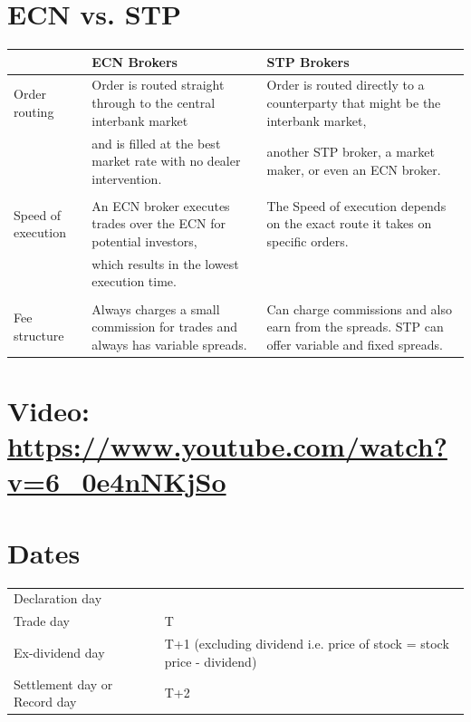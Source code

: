 \documentclass[11pt]{article}
\begin{document}
\section{ECN vs. STP}
\label{sec:org0b5b69e}
\begin{center}
\begin{tabular}{lll}
\hline
 & ECN Brokers & STP Brokers\\[0pt]
\hline
Order routing & Order is routed straight through to the central interbank market & Order is routed directly to a counterparty that might be the interbank market,\\[0pt]
 & and is filled at the best market rate with no dealer intervention. & another STP broker, a market maker, or even an ECN broker.\\[0pt]
 &  & \\[0pt]
Speed of execution & An ECN broker executes trades over the ECN for potential investors, & The Speed of execution depends on the exact route it takes on specific orders.\\[0pt]
 & which results in the lowest execution time. & \\[0pt]
 &  & \\[0pt]
Fee structure & Always charges a small commission for trades and always has variable spreads. & Can charge commissions and also earn from the spreads. STP can offer variable and fixed spreads.\\[0pt]
\hline
\end{tabular}
\end{center}


\section{Video: \url{https://www.youtube.com/watch?v=6\_0e4nNKjSo}}
\label{sec:org147552a}


\section{Dates}
\label{sec:org936b3c2}
\begin{center}
\begin{tabular}{ll}
\hline
Declaration day & \\[0pt]
Trade day & T\\[0pt]
Ex-dividend day & T+1        (excluding dividend i.e. price of stock = stock price - dividend)\\[0pt]
Settlement day or Record day & T+2\\[0pt]
\hline
\end{tabular}
\end{center}
\end{document}
